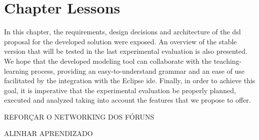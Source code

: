 \section{Chapter Lessons}
 
In this chapter, the requirements, design decisions and architecture of the \ac{dsl} proposal for the developed solution were exposed.
An overview of the stable version that will be tested in the last experimental evaluation is also presented.
We hope that the developed modeling tool can collaborate with the teaching-learning process, providing an easy-to-understand grammar and an ease of use facilitated by the integration with the Eclipse \ac{ide}.
Finally, in order to achieve this goal, it is imperative that the experimental evaluation be properly planned, executed and analyzed taking into account the features that we propose to offer.

REFORÇAR O NETWORKING DOS FÓRUNS

ALINHAR APRENDIZADO


